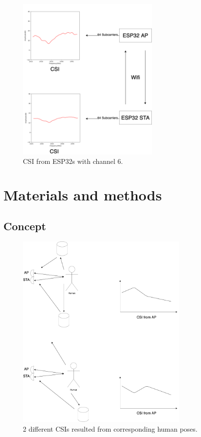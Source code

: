 \documentclass[10pt,letterpaper]{article}
\begin{document}
	\begin{figure}[htbp]
		
		\centerline{\includegraphics[width=70mm,scale=0.5]{ESP32CSI01.png}}
		\caption{CSI from ESP32s with channel 6.}
		\label{fig:ESP32CSI01}
	\end{figure}
	

	
	\section*{Materials and methods}
	
	\subsection*{Concept}
	\label{concept}
	
	\begin{figure}[htbp]
		
		\centerline{\includegraphics[width=85mm,scale=0.5]{ESP32CSI03.png}}
		\caption{2 different CSIs resulted from corresponding human poses.}
		\label{fig:ESP32CSI02}
	\end{figure}
	
\end{document}
